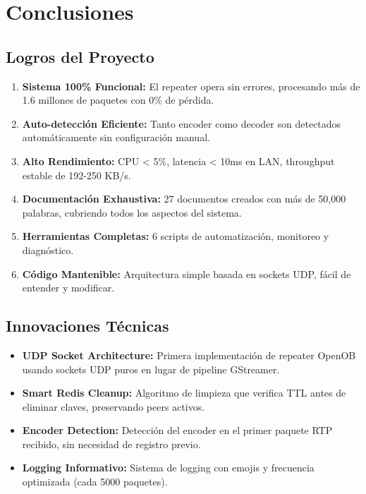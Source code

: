 \documentclass[12pt,a4paper]{article}
\begin{document}
\newpage

\section{Conclusiones}

\subsection{Logros del Proyecto}

\begin{enumerate}[itemsep=0.5em]
    \item \textbf{Sistema 100\% Funcional:} El repeater opera sin errores, procesando más de 1.6 millones de paquetes con 0\% de pérdida.
    
    \item \textbf{Auto-detección Eficiente:} Tanto encoder como decoder son detectados automáticamente sin configuración manual.
    
    \item \textbf{Alto Rendimiento:} CPU < 5\%, latencia < 10ms en LAN, throughput estable de 192-250 KB/s.
    
    \item \textbf{Documentación Exhaustiva:} 27 documentos creados con más de 50,000 palabras, cubriendo todos los aspectos del sistema.
    
    \item \textbf{Herramientas Completas:} 6 scripts de automatización, monitoreo y diagnóstico.
    
    \item \textbf{Código Mantenible:} Arquitectura simple basada en sockets UDP, fácil de entender y modificar.
\end{enumerate}

\subsection{Innovaciones Técnicas}

\begin{itemize}[itemsep=0.5em]
    \item \textbf{UDP Socket Architecture:} Primera implementación de repeater OpenOB usando sockets UDP puros en lugar de pipeline GStreamer.
    
    \item \textbf{Smart Redis Cleanup:} Algoritmo de limpieza que verifica TTL antes de eliminar claves, preservando peers activos.
    
    \item \textbf{Encoder Detection:} Detección del encoder en el primer paquete RTP recibido, sin necesidad de registro previo.
    
    \item \textbf{Logging Informativo:} Sistema de logging con emojis y frecuencia optimizada (cada 5000 paquetes).
\end{itemize}
\end{document}
